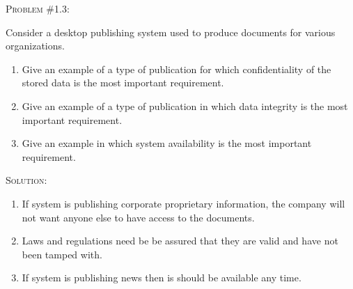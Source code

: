\documentclass[12pt]{article}
\newenvironment{problem}[1]
{\begin{mdframed}[linewidth=0.6pt]
        \textsc{Problem #1:}

}
    {\end{mdframed}}
\newenvironment{solution}
    {\textsc{Solution:}\\}
    {\newpage}%
\begin{document}
	\begin{problem}{\#1.3}
		Consider a desktop publishing system used to produce documents for various
		organizations.
		\begin{enumerate}[label=\alph*]
			\item Give an example of a type of publication for which confidentiality
				of the stored data is the most important requirement.
			\item Give an example of a type of publication in which data integrity
				is the most important requirement.
			\item Give an example in which system availability is the most important
				requirement.
		\end{enumerate}
	\end{problem}
	\begin{solution}
		\begin{enumerate}[label=\alph*]
			\item If system is publishing corporate proprietary information, the
				company will not want anyone else to have access to the
				documents.
			\item Laws and regulations need be be assured that they are valid
				and have not been tamped with.
			\item If system is publishing news then is should be available any time.
		\end{enumerate}
	\end{solution}
\end{document}
